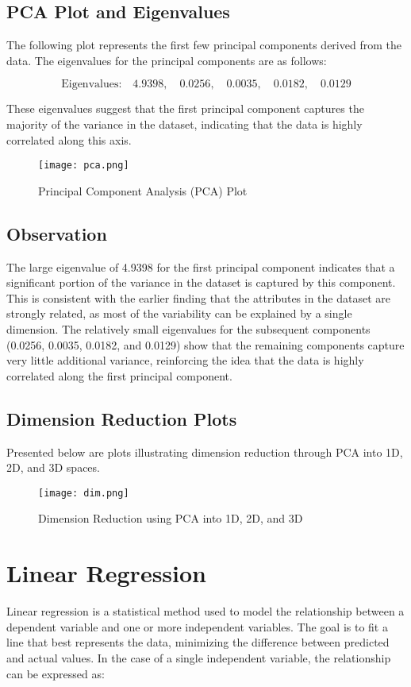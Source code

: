 \documentclass[11pt]{article}
\begin{document}
\subsection{PCA Plot and Eigenvalues}

The following plot represents the first few principal components derived from the data. The eigenvalues for the principal components are as follows:

\[
\text{Eigenvalues:} \quad 4.9398, \quad 0.0256, \quad 0.0035, \quad 0.0182, \quad 0.0129
\]

These eigenvalues suggest that the first principal component captures the majority of the variance in the dataset, indicating that the data is highly correlated along this axis.

\begin{figure}[H]
\centering
\texttt{[image: pca.png]}
\caption{Principal Component Analysis (PCA) Plot}
\label{fig:pca}
\end{figure}

\subsection{Observation}

The large eigenvalue of 4.9398 for the first principal component indicates that a significant portion of the variance in the dataset is captured by this component. This is consistent with the earlier finding that the attributes in the dataset are strongly related, as most of the variability can be explained by a single dimension. The relatively small eigenvalues for the subsequent components (0.0256, 0.0035, 0.0182, and 0.0129) show that the remaining components capture very little additional variance, reinforcing the idea that the data is highly correlated along the first principal component.

\subsection{Dimension Reduction Plots}
Presented below are plots illustrating dimension reduction through PCA into 1D, 2D, and 3D spaces.
\begin{figure}[H]
\centering
\texttt{[image: dim.png]}
\caption{Dimension Reduction using PCA into 1D, 2D, and 3D}
\label{fig:dim_reduction}
\end{figure}

\section{Linear Regression}
Linear regression is a statistical method used to model the relationship between a dependent variable and one or more independent variables. The goal is to fit a line that best represents the data, minimizing the difference between predicted and actual values. In the case of a single independent variable, the relationship can be expressed as:
\end{document}
